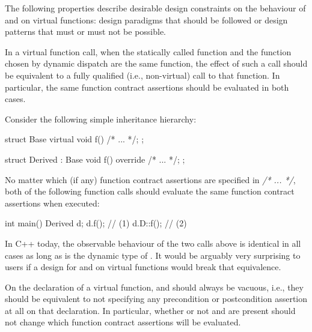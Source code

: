 The following properties describe desirable design constraints on the behaviour of  and  on virtual functions: design paradigms that should be followed or design patterns that must or must not be possible.



In a virtual function call, when the statically called function and the function chosen by dynamic dispatch are the same function, the effect of such a call should be equivalent to a fully qualified (i.e., non-virtual) call to that function. In particular, the same function contract assertions should be evaluated in both cases.

Consider the following simple inheritance hierarchy:

\begin{codeblock}
struct Base {
  virtual void f() /* ... */;
};

struct Derived : Base {
  void f() override /* ... */;
};
\end{codeblock}
No matter which (if any) function contract assertions are specified in \textit{/* ... */}, both of the following function calls should evaluate the same function contract assertions when executed:

\begin{codeblock}
int main() {
  Derived d;
  d.f();     // (1)
  d.D::f();  // (2)
}
\end{codeblock}
In C++ today, the observable behaviour of the two calls above is identical in all cases as long as  is the dynamic type of . It would be arguably very surprising to users if a design for  and  on virtual functions would break that equivalence.



On the declaration of a virtual function,  and  should always be vacuous, i.e., they should be equivalent to not specifying any precondition or postcondition assertion at all on that declaration. In particular, whether or not  and  are present should not change which function contract assertions will be evaluated.

